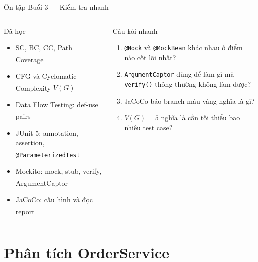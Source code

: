 \documentclass[aspectratio=169,10pt]{beamer}
\newcommand{\sref}[1]{\textsuperscript{\scriptsize\cite{#1}}}
\begin{document}
\begin{frame}[fragile]{Ôn tập Buổi 3 --- Kiểm tra nhanh}
  \begin{columns}
    \begin{block}{Đã học}
      \begin{itemize}
        \item SC, BC, CC, Path Coverage\sref{istqb}
        \item CFG và Cyclomatic Complexity $V(G)$\sref{myers}
        \item Data Flow Testing: def-use pairs\sref{istqb}
        \item JUnit 5: annotation, assertion, \texttt{@ParameterizedTest}\sref{junit5}
        \item Mockito: mock, stub, verify, ArgumentCaptor\sref{mockito}
        \item JaCoCo: cấu hình và đọc report\sref{jacoco}
      \end{itemize}
    \end{block}

    \begin{exampleblock}{Câu hỏi nhanh}
      \small
      \begin{enumerate}
        \item \texttt{@Mock} và \texttt{@MockBean} khác nhau
          ở điểm nào cốt lõi nhất?
        \item \texttt{ArgumentCaptor} dùng để làm gì mà
          \texttt{verify()} thông thường không làm được?
        \item JaCoCo báo branch màu vàng nghĩa là gì?
        \item $V(G) = 5$ nghĩa là cần tối thiểu bao nhiêu test case?
      \end{enumerate}
    \end{exampleblock}
  \end{columns}
\end{frame}

\section{Phân tích OrderService}
\end{document}
